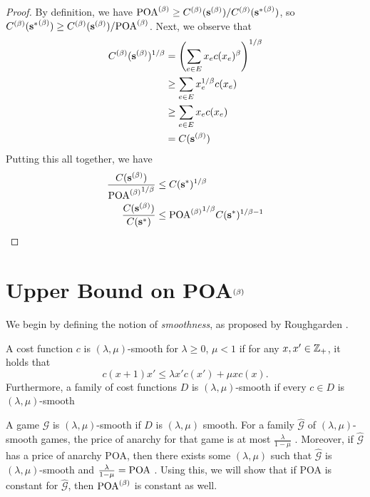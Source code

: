 \documentclass[twoside]{article}
\begin{document}
\begin{multicols}{2}
\begin{proof}
  By definition, we have $\text{POA}^{(\beta)} \ge C^{(\beta)}(\mathbf{s}^{(\beta)})/C^{(\beta)}({\mathbf{s}^*}^{(\beta)})$, so
  $C^{(\beta)}({\mathbf{s}^*}^{(\beta)}) \ge C^{(\beta)}(\mathbf{s}^{(\beta)})/\text{POA}^{(\beta)}$. Next, we observe that
  \begin{align*}
    C^{(\beta)}(\mathbf{s}^{(\beta)})^{1/\beta} &= \left(\sum_{e \in E} x_e c(x_e)^\beta\right)^{1/\beta}
    \\
    &\ge \sum_{e \in E} x_e^{1/\beta} c(x_e) \\
    &\ge \sum_{e \in E} x_e c(x_e) \\
    &= C(\mathbf{s}^{(\beta)})
  \end{align*}
  Putting this all together, we have
  \begin{align*}
    \frac{C(\mathbf{s}^{(\beta)})}{{\text{POA}^{(\beta)}}^{1/\beta}} &\le C(\mathbf{s}^*)^{1/\beta} \\
    \frac{C(\mathbf{s}^{(\beta)})}{C(\mathbf{s}^*)} &\le {\text{POA}^{(\beta)}}^{1/\beta} C(\mathbf{s}^*)^{1/\beta-1}
  \end{align*}
\end{proof}


\section{Upper Bound on POA$^{(\beta)}$} \label{sec:ubl}
We begin by defining the notion of \textit{smoothness}, as proposed by
Roughgarden \cite{Roughgarden2012}.
\begin{defn}
  A cost function $c$ is $(\lambda,\mu)$-smooth for $\lambda \ge 0$, $\mu < 1$
  if for any $x,x' \in \mathbb{Z}_+$, it holds that
  \begin{equation}
    c(x+1) x' \le \lambda x' c(x') + \mu x c(x).
    \label{eq:lms1}
  \end{equation}
  Furthermore, a family of cost functions $D$ is $(\lambda,\mu)$-smooth if every
  $c \in D$ is $(\lambda,\mu)$-smooth
\end{defn}
A game $\mathcal{G}$ is $(\lambda,\mu)$-smooth if $D$ is $(\lambda,\mu)$ smooth.
For a family $\hat{\mathcal{G}}$ of $(\lambda,\mu)$-smooth games, the price of
anarchy for that game is at most $\frac{\lambda}{1-\mu}$ \cite{Roughgarden2012}.
Moreover, if $\hat{\mathcal{G}}$ has a price of anarchy POA, then there exists
some $(\lambda,\mu)$ such that $\hat{\mathcal{G}}$ is $(\lambda,\mu)$-smooth and
$\frac{\lambda}{1-\mu} = \text{POA}$ \cite{Roughgarden2012}. Using this, we will show
that if POA is constant for $\hat{\mathcal{G}}$, then $\text{POA}^{(\beta)}$ is constant as
well.


\end{multicols}
\end{document}
